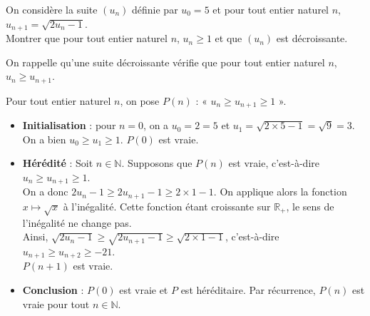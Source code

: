 \documentclass[11pt,fleqn]{book} %
\begin{document}
\begin{exercise}[topic=rec03]On considère la suite $(u_n)$ définie par $u_0=5$ et pour tout entier naturel $n$, $u_{n+1}=\sqrt{2u_n-1}$. \\Montrer que pour tout entier naturel $n$, $u_n \geqslant 1$ et que $(u_n)$ est décroissante.\end{exercise}


\begin{solution}
On rappelle qu'une suite décroissante vérifie que pour tout entier naturel $n$, $u_n \geqslant u_{n+1}$.

Pour tout entier naturel $n$, on pose $P(n)$ : « $u_n \geqslant u_{n+1} \geqslant 1$ ».

\begin{itemize}
\item \textbf{Initialisation} : pour $n=0$, on a $u_0=2=5$ et $u_1=\sqrt{2\times 5 -1}=\sqrt{9}=3$. On a bien  $u_0 \geqslant u_{1} \geqslant 1$. $P(0)$ est vraie.
\item \textbf{Hérédité} : Soit $n\in\mathbb{N}$. Supposons que $P(n)$ est vraie, c'est-à-dire $u_n \geqslant u_{n+1} \geqslant 1$.\\ On a donc $2u_n-1\geqslant 2u_{n+1}-1 \geqslant 2 \times 1 -1$. On applique alors la fonction $x\mapsto \sqrt{x}$ à l'inégalité. Cette fonction étant croissante sur $\mathbb{R}_+$, le sens de l'inégalité ne change pas. \\Ainsi, $\sqrt{2u_n-1} \geqslant \sqrt{2u_{n+1}-1} \geqslant \sqrt{2\times 1-1}$, c'est-à-dire $u_{n+1} \geqslant u_{n+2} \geqslant -21$.\\ $P(n+1)$ est vraie.
\item \textbf{Conclusion} : $P(0)$ est vraie et $P$ est héréditaire. Par récurrence, $P(n)$ est vraie pour tout $n\in\mathbb{N}$.
\end{itemize}\end{solution}
\end{document}
